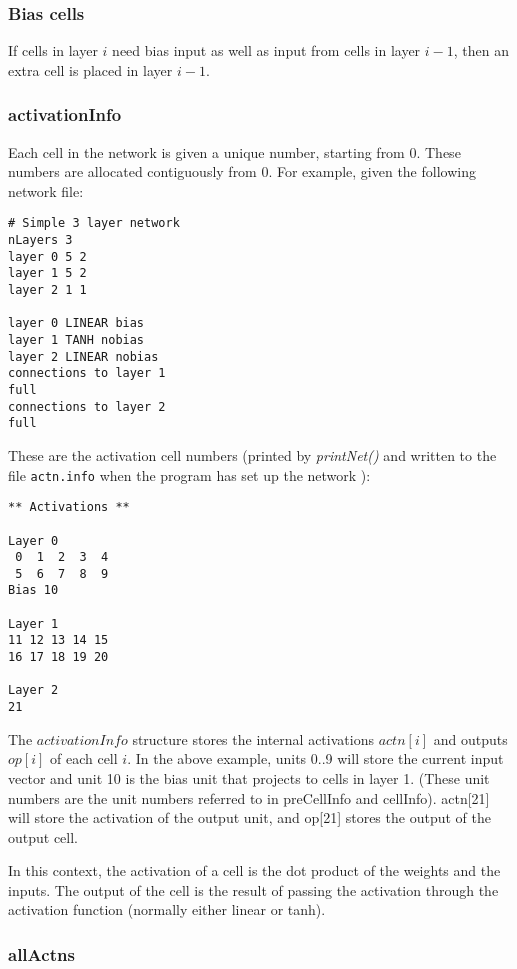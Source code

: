 \documentclass[a4paper]{article}
\begin{document}
\subsubsection{Bias cells}

If cells in layer $i$ need bias input as well as input from cells in
layer $i-1$, then an extra cell is placed in layer $i-1$.

\subsubsection{activationInfo}

Each cell in the network is given a unique number, starting from 0.
These numbers are allocated contiguously from 0.  For example, given
the following network file:

\begin{verbatim}
# Simple 3 layer network
nLayers 3
layer 0 5 2
layer 1 5 2
layer 2 1 1

layer 0 LINEAR bias
layer 1 TANH nobias
layer 2 LINEAR nobias
connections to layer 1
full
connections to layer 2
full
\end{verbatim}

These are the activation cell numbers (printed by {\em printNet()} and
written to the file \texttt{actn.info} when the program has set up the network ):  

\begin{verbatim}
** Activations **

Layer 0
 0  1  2  3  4 
 5  6  7  8  9 
Bias 10

Layer 1
11 12 13 14 15 
16 17 18 19 20 

Layer 2
21 
\end{verbatim}

The $activationInfo$ structure stores the internal activations $actn[i]$ and
outputs $op[i]$ of each cell $i$.  In the above example, units 0..9
will store the current input vector and unit 10 is the bias unit that
projects to cells in layer 1.  (These unit numbers are the unit
numbers referred to in preCellInfo and cellInfo).  actn[21] will
store the activation of the output unit, and op[21] stores the output
of the output cell.

In this context, the activation of a cell is the dot product of the
weights and the inputs. The output of the cell is the result of
passing the activation through the activation function (normally
either linear or tanh).

\subsubsection{allActns}
\end{document}
